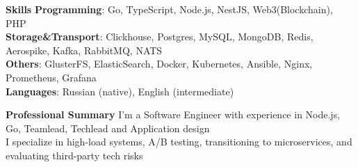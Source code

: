 \documentclass[a4paper]{resume} %
\begin{document}
\begin{rSection}{\textbf{Skills}}
       \textbf{Programming}: Go, TypeScript, Node.js, NestJS, Web3(Blockchain), PHP
       \\ \textbf{Storage\&Transport}: Clickhouse, Postgres, MySQL, MongoDB, Redis, Aerospike, Kafka, RabbitMQ, NATS
       \\ \textbf{Others}: GlusterFS, ElasticSearch, Docker, Kubernetes, Ansible, Nginx, Prometheus, Grafana
       \\ \textbf{Languages}: Russian (native), English (intermediate)
\end{rSection}

\begin{rSection}{\textbf{Professional Summary}}
{
    I'm a Software Engineer with experience in Node.js, Go, Teamlead, Techlead and Application design
    \\ I specialize in high-load systems, A/B testing, transitioning to microservices, and evaluating third-party tech risks
}

\end{rSection}
\end{document}
